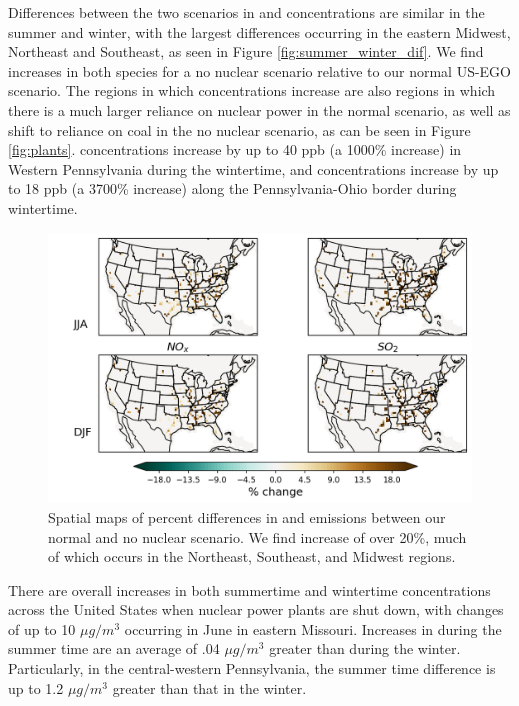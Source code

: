 \documentclass[12]{article}
\begin{document}
Differences between the two scenarios in  and  concentrations are similar in the summer and winter, with the largest differences occurring in the eastern Midwest, Northeast and Southeast, as seen in Figure \ref{fig:summer_winter_dif}. We find increases in both species for a no nuclear scenario relative to our normal US-EGO scenario. The regions in which concentrations increase are also regions in which there is a much larger reliance on nuclear power in the normal scenario, as well as shift to reliance on coal in the no nuclear scenario, as can be seen in Figure \ref{fig:plants}.  concentrations increase by up to 40 ppb (a 1000\% increase) in Western Pennsylvania during the wintertime, and  concentrations increase by up to 18 ppb (a 3700\% increase) along the Pennsylvania-Ohio border during wintertime. 

\begin{figure}[!htbp]
    \centering
    \includegraphics[width=1.01\textwidth]{ego_nonuclear_project/Figures/nox_so2_emissions.png}
    \caption{Spatial maps of percent differences in  and  emissions between our normal and no nuclear scenario. We find increase of over 20\%, much of which occurs in the Northeast, Southeast, and Midwest regions.} 
    \label{fig:emissions_nonuc}
\end{figure}

There are overall increases in both summertime and wintertime  concentrations across the United States when nuclear power plants are shut down, with changes of up to 10 $\mu g/m^3$ occurring in June in eastern Missouri. Increases in  during the summer time are an average of .04 $\mu g/m^3$ greater than during the winter. Particularly, in the central-western Pennsylvania, the summer time  difference is up to 1.2 $\mu g/m^3$ greater than that in the winter. 
\end{document}
